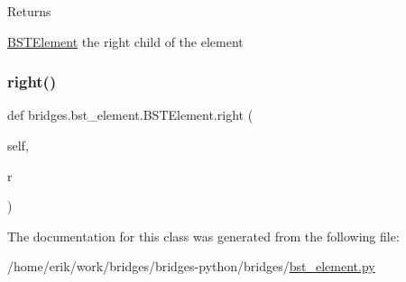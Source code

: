 \begin{DoxyReturn}{Returns}


\hyperlink{classbridges_1_1bst__element_1_1_b_s_t_element}{B\+S\+T\+Element} the right child of the element 
\end{DoxyReturn}
\mbox{\label{classbridges_1_1bst__element_1_1_b_s_t_element_a978ae0db366dee59703ed266eebca0e9}} 
\subsubsection{\texorpdfstring{right()}{right()}\hspace{0.1cm}{\footnotesize\ttfamily [2/2]}}
{\footnotesize\ttfamily def bridges.\+bst\+\_\+element.\+B\+S\+T\+Element.\+right (\begin{DoxyParamCaption}\item[{}]{self,  }\item[{}]{r }\end{DoxyParamCaption})}



The documentation for this class was generated from the following file\+:\begin{DoxyCompactItemize}
\item 
/home/erik/work/bridges/bridges-\/python/bridges/\hyperlink{bst__element_8py}{bst\+\_\+element.\+py}\end{DoxyCompactItemize}
